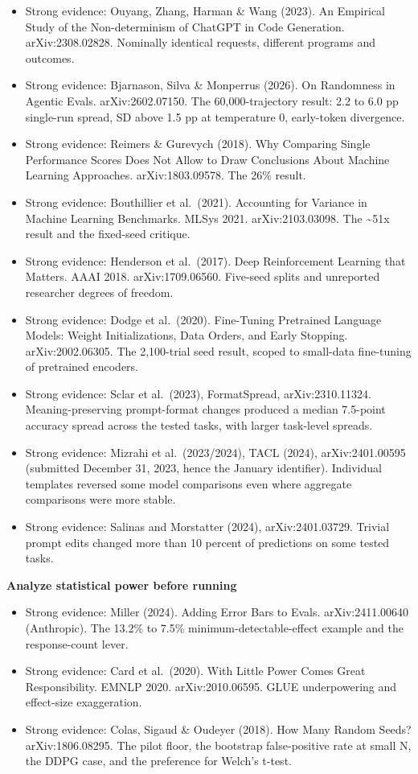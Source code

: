 \begin{itemize}
\tightlist
\item
  Strong evidence: Ouyang, Zhang, Harman \& Wang (2023). An Empirical Study of the Non-determinism of ChatGPT in Code Generation. arXiv:2308.02828. Nominally identical requests, different programs and outcomes.
\item
  Strong evidence: Bjarnason, Silva \& Monperrus (2026). On Randomness in Agentic Evals. arXiv:2602.07150. The 60,000-trajectory result: 2.2 to 6.0 pp single-run spread, SD above 1.5 pp at temperature 0, early-token divergence.
\item
  Strong evidence: Reimers \& Gurevych (2018). Why Comparing Single Performance Scores Does Not Allow to Draw Conclusions About Machine Learning Approaches. arXiv:1803.09578. The 26\% result.
\item
  Strong evidence: Bouthillier et al.~(2021). Accounting for Variance in Machine Learning Benchmarks. MLSys 2021. arXiv:2103.03098. The \textasciitilde51x result and the fixed-seed critique.
\item
  Strong evidence: Henderson et al.~(2017). Deep Reinforcement Learning that Matters. AAAI 2018. arXiv:1709.06560. Five-seed splits and unreported researcher degrees of freedom.
\item
  Strong evidence: Dodge et al.~(2020). Fine-Tuning Pretrained Language Models: Weight Initializations, Data Orders, and Early Stopping. arXiv:2002.06305. The 2,100-trial seed result, scoped to small-data fine-tuning of pretrained encoders.
\item
  Strong evidence: Sclar et al.~(2023), FormatSpread, arXiv:2310.11324. Meaning-preserving prompt-format changes produced a median 7.5-point accuracy spread across the tested tasks, with larger task-level spreads.
\item
  Strong evidence: Mizrahi et al.~(2023/2024), TACL (2024), arXiv:2401.00595 (submitted December 31, 2023, hence the January identifier). Individual templates reversed some model comparisons even where aggregate comparisons were more stable.
\item
  Strong evidence: Salinas and Morstatter (2024), arXiv:2401.03729. Trivial prompt edits changed more than 10 percent of predictions on some tested tasks.
\end{itemize}

\textbf{Analyze statistical power before running}

\begin{itemize}
\tightlist
\item
  Strong evidence: Miller (2024). Adding Error Bars to Evals. arXiv:2411.00640 (Anthropic). The 13.2\% to 7.5\% minimum-detectable-effect example and the response-count lever.
\item
  Strong evidence: Card et al.~(2020). With Little Power Comes Great Responsibility. EMNLP 2020. arXiv:2010.06595. GLUE underpowering and effect-size exaggeration.
\item
  Strong evidence: Colas, Sigaud \& Oudeyer (2018). How Many Random Seeds? arXiv:1806.08295. The pilot floor, the bootstrap false-positive rate at small N, the DDPG case, and the preference for Welch's t-test.
\end{itemize}

